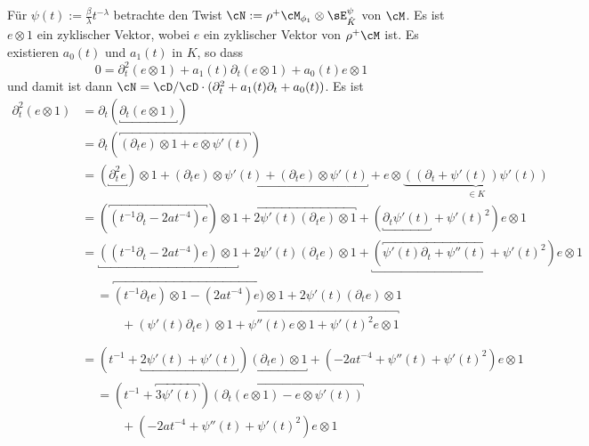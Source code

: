 \begin{try}
Für $\psi(t):=\frac{\beta}{\lambda}t^{-\lambda}$ betrachte den Twist
$\cN:=\rho^+\cM_{\phi_1}\otimes\sE_{\hat K}^\psi$ von $\cM$.  Es ist $e\otimes
1$ ein zyklischer Vektor, wobei $e$ ein zyklischer Vektor von $\rho^+\cM$ ist.
Es existieren $a_0(t)$ und $a_1(t)$ in $K$, so dass
\[
0=\partial_t^2 (e\otimes 1) + a_1(t)\partial_t (e\otimes 1) + a_0(t) e\otimes 1
\]
und damit ist dann $\cN=\cD/\cD\cdot(\partial_t^2+a_1(t)\partial_t+a_0(t))$.
Es ist
\begin{align*}
\partial_t^2(e\otimes 1) &= \partial_t(\underbracket{\partial_t(e\otimes 1)})
\\&= \partial_t(\overbracket{(\partial_te)\otimes 1
    + e\otimes \psi'(t)})
\\&= (\underbracket{\partial_t^2 e})\otimes 1
    + \underbracket{(\partial_t e)\otimes \psi'(t)
    +               (\partial_t e)\otimes \psi'(t)}
    + e\otimes\underset{\in K}{\underbrace{((\partial_t+\psi'(t))\psi'(t))}}
\\&= (\overbracket{(t^{-1}\partial_t - 2at^{-4}) e})\otimes 1
    + \overbracket{2\psi'(t) (\partial_t e)\otimes 1}
    + (\underbracket{\partial_t\psi'(t)} + \psi'(t)^2)e\otimes 1
\\&= \underbracket{((t^{-1}\partial_t - 2at^{-4}) e)\otimes 1}
    + 2\psi'(t) (\partial_t e)\otimes 1
    + \underbracket{(\overbracket{\psi'(t)\partial_t + \psi''(t)} +
    \psi'(t)^2)e\otimes 1}
\\&\begin{aligned}
    &= \overbracket{
        (t^{-1}\partial_t e)\otimes 1
        - (2at^{-4}) e)\otimes 1
      }
      + 2\psi'(t) (\partial_t e)\otimes 1
  \\&\qquad + \overbracket{
        (\psi'(t)\partial_t e)\otimes 1
        + \psi''(t) e\otimes 1
        + \psi'(t)^2 e\otimes 1
      }
\\\end{aligned}
\\&= (t^{-1} + \underbracket{2\psi'(t) + \psi'(t)})
    \underbracket{(\partial_t e)\otimes 1}
    + (- 2at^{-4} + \psi''(t) + \psi'(t)^2) e\otimes 1 \\&\begin{aligned} &=
    (t^{-1} + \overbracket{3\psi'(t)})\overbracket{(\partial_t (e\otimes 1) -
    e\otimes \psi'(t))}
  \\&\qquad + (- 2at^{-4} + \psi''(t) + \psi'(t)^2) e\otimes 1
\\\end{aligned}

\end{align*}
\end{try}
